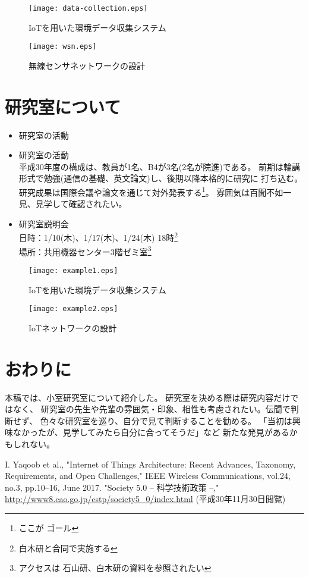 ﻿\documentclass[a4j,10pt,twocolumn,oneside,notitlepage,fleqn,final]{jarticle}
\begin{document}
\begin{figure}[th]
\texttt{[image: data-collection.eps]}
\caption{IoTを用いた環境データ収集システム}
\label{fig:data-collection}
\end{figure}

\begin{figure}[th]
\texttt{[image: wsn.eps]}
\caption{無線センサネットワークの設計}
\label{fig:wsn}
\end{figure}

\section{研究室について}
\begin{itemize}
\setlength{\itemsep}{-1mm}
\item 研究室の活動\\
\item 研究室の活動\\
平成30年度の構成は、教員が1名、B4が3名(2名が院進)である。
前期は輪講形式で勉強(通信の基礎、英文論文)し、後期以降本格的に研究に
打ち込む。研究成果は国際会議や論文を通じて対外発表する\footnote{ここが
ゴール}。
雰囲気は百聞不如一見、見学して確認されたい。
\item 研究室説明会\\
日時：1/10(木)、1/17(木)、1/24(木) 18時\footnote{白木研と合同で実施する}\\
場所：共用機器センター3階ゼミ室\footnote{アクセスは
石山研、白木研の資料を参照されたい}
\end{itemize}

\begin{figure}[bth]
\texttt{[image: example1.eps]}
\caption{IoTを用いた環境データ収集システム}
\label{fig:example1}
\end{figure}

\begin{figure}[tbh]
\texttt{[image: example2.eps]}
\caption{IoTネットワークの設計}
\label{fig:example2}
\end{figure}
\fi

\section{おわりに}
本稿では、小室研究室について紹介した。 研究室を決める際は研究内容だけではなく、
研究室の先生や先輩の雰囲気・印象、相性も考慮されたい。伝聞で判断せず、
色々な研究室を巡り、自分で見て判断することを勧める。
「当初は興味なかったが、見学してみたら自分に合ってそうだ」など
新たな発見があるかもしれない。

\small{
\begin{thebibliography}{9}%
\setlength{\itemsep}{-1mm}
 I. Yaqoob et al., 
"Internet of Things Architecture: Recent Advances, Taxonomy, Requirements, 
and Open Challenges," IEEE Wireless Communications, vol.24, no.3, pp.10--16, 
June 2017.
 "Society 5.0 -- 科学技術政策 --,"
\url{http://www8.cao.go.jp/cstp/society5_0/index.html} (平成30年11月30日閲覧)
\end{thebibliography}
}
\end{document}
